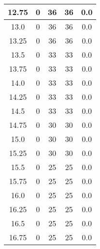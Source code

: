 \documentclass[letterpaper, 12pt]{article}
\begin{document}
\begin{longtable}{|c|c|c|c|c|}
\hline
12.75 & 0 & 36 & 36 & 0.0 \\
\hline
13.0 & 0 & 36 & 36 & 0.0 \\
\hline
13.25 & 0 & 36 & 36 & 0.0 \\
\hline
13.5 & 0 & 33 & 33 & 0.0 \\
\hline
13.75 & 0 & 33 & 33 & 0.0 \\
\hline
14.0 & 0 & 33 & 33 & 0.0 \\
\hline
14.25 & 0 & 33 & 33 & 0.0 \\
\hline
14.5 & 0 & 33 & 33 & 0.0 \\
\hline
14.75 & 0 & 30 & 30 & 0.0 \\
\hline
15.0 & 0 & 30 & 30 & 0.0 \\
\hline
15.25 & 0 & 30 & 30 & 0.0 \\
\hline
15.5 & 0 & 25 & 25 & 0.0 \\
\hline
15.75 & 0 & 25 & 25 & 0.0 \\
\hline
16.0 & 0 & 25 & 25 & 0.0 \\
\hline
16.25 & 0 & 25 & 25 & 0.0 \\
\hline
16.5 & 0 & 25 & 25 & 0.0 \\
\hline
16.75 & 0 & 25 & 25 & 0.0 \\
\hline
\end{longtable}
\end{document}
